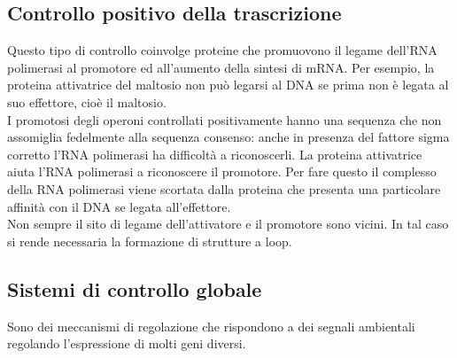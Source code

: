 \subsection{Controllo positivo della trascrizione}
Questo tipo di controllo coinvolge proteine che promuovono il legame dell'RNA polimerasi al promotore ed all'aumento della sintesi di mRNA. Per esempio, la proteina attivatrice del maltosio non può legarsi al DNA se prima non è legata al suo effettore, cioè il maltosio. 
\\I promotosi degli operoni controllati positivamente hanno una sequenza che non assomiglia fedelmente alla sequenza consenso: anche in presenza del fattore sigma corretto l'RNA polimerasi ha difficoltà a riconoscerli. La proteina attivatrice aiuta l'RNA polimerasi a riconoscere il promotore. Per fare questo il complesso della RNA polimerasi viene scortata dalla proteina che presenta una particolare affinità con il DNA se legata all'effettore.
\\Non sempre il sito di legame dell'attivatore e il promotore sono vicini. In tal caso si rende necessaria la formazione di strutture a loop.
\subsection{Sistemi di controllo globale}
Sono dei meccanismi di regolazione che rispondono a dei segnali ambientali regolando l'espressione di molti geni diversi. 
